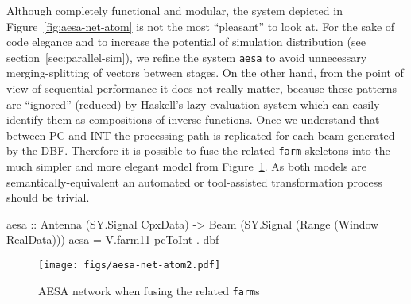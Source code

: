 \documentclass[
  a4paper,
]{article}
\newenvironment{Shaded}{}{}
\newcommand{\DataTypeTok}[1]{\textcolor[rgb]{0.56,0.13,0.00}{#1}}
\newcommand{\FunctionTok}[1]{\textcolor[rgb]{0.02,0.16,0.49}{#1}}
\newcommand{\KeywordTok}[1]{\textcolor[rgb]{0.00,0.44,0.13}{\textbf{#1}}}
\newcommand{\NormalTok}[1]{#1}
\newcommand{\OtherTok}[1]{\textcolor[rgb]{0.00,0.44,0.13}{#1}}
\begin{document}
Although completely functional and modular, the system depicted in
Figure~\ref{fig:aesa-net-atom} is not the most ``pleasant'' to look at.
For the sake of code elegance and to increase the potential of
simulation distribution (see section~\ref{sec:parallel-sim}), we refine
the system \texttt{aesa\textquotesingle{}} to avoid unnecessary
merging-splitting of vectors between stages. On the other hand, from the
point of view of sequential performance it does not really matter,
because these patterns are ``ignored'' (reduced) by Haskell's lazy
evaluation system which can easily identify them as compositions of
inverse functions. Once we understand that between PC and INT the
processing path is replicated for each beam generated by the DBF.
Therefore it is possible to fuse the related \texttt{farm} skeletons
into the much simpler and more elegant model from
Figure~\ref{fig:aesa-net-atom2}. As both models are
semantically-equivalent an automated or tool-assisted transformation
process should be trivial.

\begin{Shaded}
\begin{Highlighting}[numbers=left,,firstnumber=655,]
\OtherTok{aesa ::} \DataTypeTok{Antenna}\NormalTok{ (}\DataTypeTok{SY.Signal} \DataTypeTok{CpxData}\NormalTok{) }\OtherTok{->} \DataTypeTok{Beam}\NormalTok{ (}\DataTypeTok{SY.Signal}\NormalTok{ (}\DataTypeTok{Range}\NormalTok{ (}\DataTypeTok{Window} \DataTypeTok{RealData}\NormalTok{)))}
\NormalTok{aesa }\FunctionTok{=}\NormalTok{ V.farm11 pcToInt }\FunctionTok{.}\NormalTok{ dbf}
\end{Highlighting}
\end{Shaded}

\begin{Shaded}
\end{Shaded}

\begin{figure}
\hypertarget{fig:aesa-net-atom2}{%
\centering
\texttt{[image: figs/aesa-net-atom2.pdf]}
\caption{AESA network when fusing the related
\texttt{farm}s}\label{fig:aesa-net-atom2}
}
\end{figure}
\end{document}
